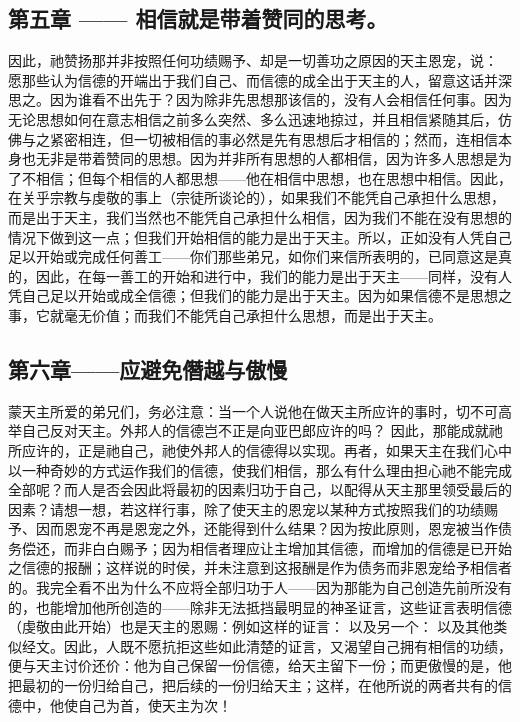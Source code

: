 
\subsection{第五章 —— 相信就是带着赞同的思考。}

因此，祂赞扬那并非按照任何功绩赐予、却是一切善功之原因的天主恩宠，说： 愿那些认为信德的开端出于我们自己、而信德的成全出于天主的人，留意这话并深思之。因为谁看不出先于？因为除非先思想那该信的，没有人会相信任何事。因为无论思想如何在意志相信之前多么突然、多么迅速地掠过，并且相信紧随其后，仿佛与之紧密相连，但一切被相信的事必然是先有思想后才相信的；然而，连相信本身也无非是带着赞同的思想。因为并非所有思想的人都相信，因为许多人思想是为了不相信；但每个相信的人都思想——他在相信中思想，也在思想中相信。因此，在关乎宗教与虔敬的事上（宗徒所谈论的），如果我们不能凭自己承担什么思想，而是出于天主，我们当然也不能凭自己承担什么相信，因为我们不能在没有思想的情况下做到这一点；但我们开始相信的能力是出于天主。所以，正如没有人凭自己足以开始或完成任何善工——你们那些弟兄，如你们来信所表明的，已同意这是真的，因此，在每一善工的开始和进行中，我们的能力是出于天主——同样，没有人凭自己足以开始或成全信德；但我们的能力是出于天主。因为如果信德不是思想之事，它就毫无价值；而我们不能凭自己承担什么思想，而是出于天主。\par


\subsection{第六章——应避免僭越与傲慢}

蒙天主所爱的弟兄们，务必注意：当一个人说他在做天主所应许的事时，切不可高举自己反对天主。外邦人的信德岂不正是向亚巴郎应许的吗？  因此，那能成就祂所应许的，正是祂自己，祂使外邦人的信德得以实现。再者，如果天主在我们心中以一种奇妙的方式运作我们的信德，使我们相信，那么有什么理由担心祂不能完成全部呢？而人是否会因此将最初的因素归功于自己，以配得从天主那里领受最后的因素？请想一想，若这样行事，除了使天主的恩宠以某种方式按照我们的功绩赐予、因而恩宠不再是恩宠之外，还能得到什么结果？因为按此原则，恩宠被当作债务偿还，而非白白赐予；因为相信者理应让主增加其信德，而增加的信德是已开始之信德的报酬；这样说的时侯，并未注意到这报酬是作为债务而非恩宠给予相信者的。我完全看不出为什么不应将全部归功于人——因为那能为自己创造先前所没有的，也能增加他所创造的——除非无法抵挡最明显的神圣证言，这些证言表明信德（虔敬由此开始）也是天主的恩赐：例如这样的证言： 以及另一个： 以及其他类似经文。因此，人既不愿抗拒这些如此清楚的证言，又渴望自己拥有相信的功绩，便与天主讨价还价：他为自己保留一份信德，给天主留下一份；而更傲慢的是，他把最初的一份归给自己，把后续的一份归给天主；这样，在他所说的两者共有的信德中，他使自己为首，使天主为次！\par


